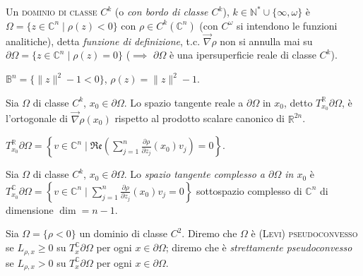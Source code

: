 \begin{defn}
  Un \textsc{dominio di classe $C^k$} (o \textit{con bordo di classe $C^k$}), $k \in \mathbb{N}^*\cup\{\infty, \omega\}$ è $\Omega=\{z \in \mathbb{C}^n \mid \rho(z)<0\}$ con $\rho \in C^k(\mathbb{C}^n)$ (con $C^{\omega}$ si intendono le funzioni analitiche), detta \textit{funzione di definizione},
  t.c. $\vec{\nabla}\rho$ non si annulla mai su $\partial\Omega=\{z \in \mathbb{C}^n \mid \rho(z)=0\}$ ($\implies$ $\partial\Omega$ è una ipersuperficie reale di classe $C^k$).
\end{defn}

\begin{ex}
  $\mathbb{B}^n=\{\|z\|^2-1<0\}$, $\rho(z)=\|z\|^2-1$.
\end{ex}

\begin{oss}
  Sia $\Omega$ di classe $C^k$, $x_0 \in \partial\Omega$. Lo spazio tangente reale a $\partial\Omega$ in $x_0$, detto $T_{x_0}^{\mathbb{R}}\partial\Omega$, è l'ortogonale di $\vec{\nabla}\rho(x_0)$ rispetto al prodotto scalare canonico di $\mathbb{R}^{2n}$.
\end{oss}

\begin{exc}
  $\displaystyle T_{x_0}^{\mathbb{R}}\partial\Omega=\left\{v \in \mathbb{C}^n \mid \mathfrak{Re}\left(\sum_{j=1}^n \frac{\partial\rho}{\partial z_j}(x_0)v_j\right)=0\right\}$.
\end{exc}

\begin{defn}
  Sia $\Omega$ di classe $C^k$, $x_0 \in \partial\Omega$. Lo \textit{spazio tangente complesso a $\partial\Omega$ in $x_0$} è $\displaystyle T_{x_0}^{\mathbb{C}}\partial\Omega=\left\{v \in \mathbb{C}^n \mid \sum_{j=1}^n \frac{\partial\rho}{\partial z_j}(x_0)v_j=0\right\}$ sottospazio complesso di $\mathbb{C}^n$ di dimensione $\dim=n-1$.
\end{defn}

\begin{defn}
  Sia $\Omega=\{\rho<0\}$ un dominio di classe $C^2$. Diremo che $\Omega$ è \textsc{(Levi) pseudoconvesso} se $L_{\rho,x} \ge 0$ su $T_x^{\mathbb{C}}\partial\Omega$ per ogni $x \in \partial\Omega$; diremo che è \textit{strettamente pseudoconvesso} se $L_{\rho,x} > 0$ su $T_x^{\mathbb{C}}\partial\Omega$ per ogni $x \in \partial\Omega$.
\end{defn}

